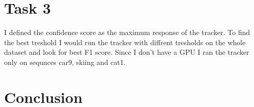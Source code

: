 \documentclass[9pt]{IEEEtran}
\begin{document}
\section{Task 3}
I defined the confidence score as the maximum response of the tracker. To find the best treshold I would run the tracker with diffrent tresholds on the whole dataset and look for best F1 score. Since I don't have a GPU I ran the tracker only on sequnces car9, skiing and cat1.

\section{Conclusion}




\end{document}
